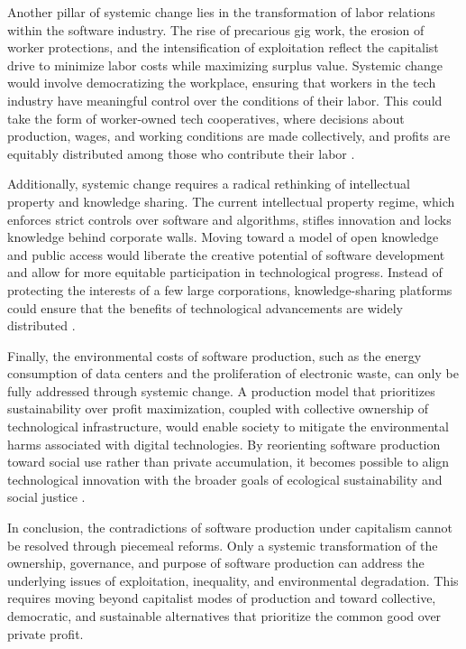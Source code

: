 Another pillar of systemic change lies in the transformation of labor relations within the software industry. The rise of precarious gig work, the erosion of worker protections, and the intensification of exploitation reflect the capitalist drive to minimize labor costs while maximizing surplus value. Systemic change would involve democratizing the workplace, ensuring that workers in the tech industry have meaningful control over the conditions of their labor. This could take the form of worker-owned tech cooperatives, where decisions about production, wages, and working conditions are made collectively, and profits are equitably distributed among those who contribute their labor \cite[pp.~131-134]{scholz2017}.

Additionally, systemic change requires a radical rethinking of intellectual property and knowledge sharing. The current intellectual property regime, which enforces strict controls over software and algorithms, stifles innovation and locks knowledge behind corporate walls. Moving toward a model of open knowledge and public access would liberate the creative potential of software development and allow for more equitable participation in technological progress. Instead of protecting the interests of a few large corporations, knowledge-sharing platforms could ensure that the benefits of technological advancements are widely distributed \cite[pp.~89-91]{lessig2004}.

Finally, the environmental costs of software production, such as the energy consumption of data centers and the proliferation of electronic waste, can only be fully addressed through systemic change. A production model that prioritizes sustainability over profit maximization, coupled with collective ownership of technological infrastructure, would enable society to mitigate the environmental harms associated with digital technologies. By reorienting software production toward social use rather than private accumulation, it becomes possible to align technological innovation with the broader goals of ecological sustainability and social justice \cite[pp.~203-205]{maxwell2012}.

In conclusion, the contradictions of software production under capitalism cannot be resolved through piecemeal reforms. Only a systemic transformation of the ownership, governance, and purpose of software production can address the underlying issues of exploitation, inequality, and environmental degradation. This requires moving beyond capitalist modes of production and toward collective, democratic, and sustainable alternatives that prioritize the common good over private profit.
